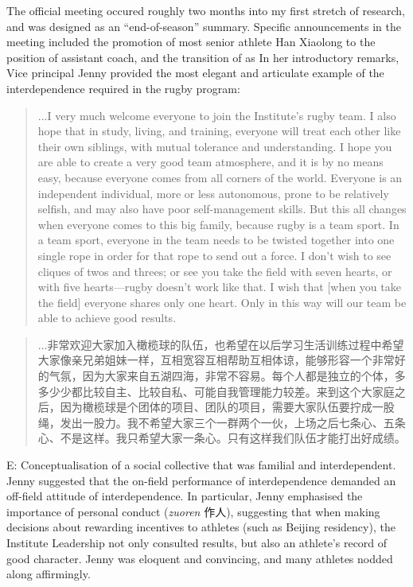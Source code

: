 \begin{CJK}{UTF8}{gbsn}
The official meeting occured roughly two months into my first stretch of research, and was designed as an ``end-of-season'' summary.  Specific announcements in the meeting included the promotion of most senior athlete Han Xiaolong to the position of assistant coach, and the transition of
as In her introductory remarks, Vice principal Jenny provided the most elegant and articulate example of the interdependence required in the rugby program:
  \begin{quote}
    ...I very much welcome everyone to join the Institute's rugby team. I also hope that in study, living, and training, everyone will treat each other like their own siblings, with mutual tolerance and understanding.  I hope you are able to create a very good team atmosphere, and it is by no means easy, because everyone comes from all corners of the world. Everyone is an independent individual, more or less autonomous, prone to be relatively selfish, and may also have poor self-management skills.  But this all changes when everyone comes to this big family, because rugby is a team sport.  In a team sport, everyone in the team needs to be twisted together into one single rope in order for that rope to send out a force. I don't wish to see cliques of twos and threes; or see you take the field with seven hearts, or with five hearts---rugby doesn't work like that. I wish that [when you take the field] everyone shares only one heart. Only in this way will our team be able to achieve good results.
\end{quote}
\begin{quote}
    ...非常欢迎大家加入橄榄球的队伍，也希望在以后学习生活训练过程中希望大家像亲兄弟姐妹一样，互相宽容互相帮助互相体谅，能够形容一个非常好的气氛，因为大家来自五湖四海，非常不容易。每个人都是独立的个体，多多少少都比较自主、比较自私、可能自我管理能力较差。来到这个大家庭之后，因为橄榄球是个团体的项目、团队的项目，需要大家队伍要拧成一股绳，发出一股力。我不希望大家三个一群两个一伙，上场之后七条心、五条心、不是这样。我只希望大家一条心。只有这样我们队伍才能打出好成绩。
\end{quote}

E: Conceptualisation of a social collective that was familial and interdependent.  Jenny suggested that the on-field performance of interdependence demanded an off-field attitude of interdependence.
In particular, Jenny emphasised the importance of personal conduct (\textit{zuoren} 作人), suggesting that when making decisions about rewarding incentives to athletes (such as Beijing residency), the Institute Leadership not only consulted results, but also an athlete’s record of good character.
Jenny was eloquent and convincing, and many athletes nodded along affirmingly.


\end{CJK}
